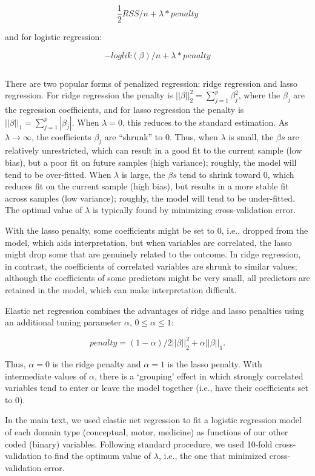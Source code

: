 \documentclass[
]{article}
\begin{document}
\[
\frac{1}{2}RSS/n + \lambda * penalty
\]

and for logistic regression:

\[
-loglik(\beta)/n + \lambda * penalty
\]

\[
\]

There are two popular forms of penalized regression: ridge regression and lasso regression. For ridge regression the penalty is \(||\beta||_2^2 = \sum_{j=1}^p\beta_j^2\), where the \(\beta_j\) are the regression coefficients, and for lasso regression the penalty is \(||\beta||_1 = \sum_{j=1}^p|\beta_j|\). When \(\lambda=0\), this reduces to the standard estimation. As \(\lambda \rightarrow \infty\), the coefficients \(\beta_j\) are ``shrunk'' to 0. Thus, when \(\lambda\) is small, the \(\beta s\) are relatively unrestricted, which can result in a good fit to the current sample (low bias), but a poor fit on future samples (high variance); roughly, the model will tend to be over-fitted. When \(\lambda\) is large, the \(\beta s\) tend to shrink toward 0, which reduces fit on the current sample (high bias), but results in a more stable fit across samples (low variance); roughly, the model will tend to be under-fitted. The optimal value of \(\lambda\) is typically found by minimizing cross-validation error.

With the lasso penalty, some coefficients might be set to 0, i.e., dropped from the model, which aids interpretation, but when variables are correlated, the lasso might drop some that are genuinely related to the outcome. In ridge regression, in contrast, the coefficients of correlated variables are shrunk to similar values; although the coefficients of some predictors might be very small, all predictors are retained in the model, which can make interpretation difficult.

Elastic net regression combines the advantages of ridge and lasso penalties using an additional tuning parameter \(\alpha\), \(0\leq \alpha \leq1\):

\[
penalty = (1-\alpha)/2||\beta||_2^2+\alpha||\beta||_1.
\]

Thus, \(\alpha=0\) is the ridge penalty and \(\alpha=1\) is the lasso penalty. With intermediate values of \(\alpha\), there is a `grouping' effect in which strongly correlated variables tend to enter or leave the model together (i.e., have their coefficients set to 0).

In the main text, we used elastic net regression to fit a logistic regression model of each domain type (conceptual, motor, medicine) as functions of our other coded (binary) variables. Following standard procedure, we used 10-fold cross-validation to find the optimum value of \(\lambda\), i.e., the one that minimized cross-validation error.
\end{document}

